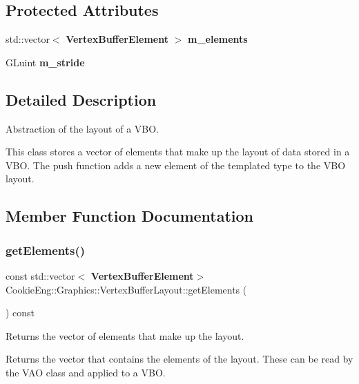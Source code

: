 \subsection*{Protected Attributes}
\begin{DoxyCompactItemize}
\item 
std\+::vector$<$ \textbf{ Vertex\+Buffer\+Element} $>$ \textbf{ m\+\_\+elements}
\item 
G\+Luint \textbf{ m\+\_\+stride}
\end{DoxyCompactItemize}


\subsection{Detailed Description}
Abstraction of the layout of a V\+BO. 

This class stores a vector of elements that make up the layout of data stored in a V\+BO. The push function adds a new element of the templated type to the V\+BO layout. 

\subsection{Member Function Documentation}
\mbox{\label{class_cookie_eng_1_1_graphics_1_1_vertex_buffer_layout_a082cc08b182cabe19998ae522c0466be}} 
\subsubsection{get\+Elements()}
{\footnotesize\ttfamily const std\+::vector$<$\textbf{ Vertex\+Buffer\+Element}$>$ Cookie\+Eng\+::\+Graphics\+::\+Vertex\+Buffer\+Layout\+::get\+Elements (\begin{DoxyParamCaption}{ }\end{DoxyParamCaption}) const\hspace{0.3cm}{\ttfamily [inline]}}



Returns the vector of elements that make up the layout. 

Returns the vector that contains the elements of the layout. These can be read by the V\+AO class and applied to a V\+BO. \mbox{\label{class_cookie_eng_1_1_graphics_1_1_vertex_buffer_layout_a4c771d06898767d1a92237b03a53e887}} 
